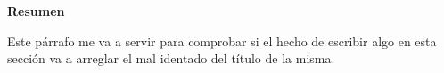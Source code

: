
\noindent \begin{large}\textbf{Resumen}\end{large}
\newline
\newline

\noindent Este párrafo me va a servir para comprobar si el hecho de escribir algo en esta sección va a arreglar el mal identado del título de la misma.
